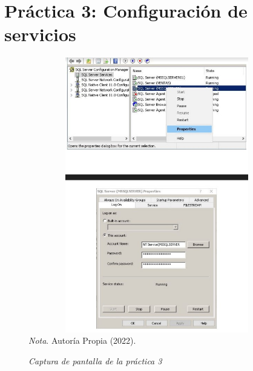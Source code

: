 \documentclass[stu, 12pt, letterpaper, donotrepeattitle, floatsintext, natbib]{apa7}
\begin{document}
\section{Práctica 3: Configuración de servicios}
\begin{figure}[H]
    \caption{\emph{Captura de pantalla de la práctica 3\\}}
    \centering
    \smallskip
    \includegraphics[width=17cm, height=12cm]{act4.jpg}
    \bigskip
    \justifying\small\textit{Nota}. %
    Autoría Propia (2022).
\end{figure}
\vspace{\baselineskip}
\end{document}

